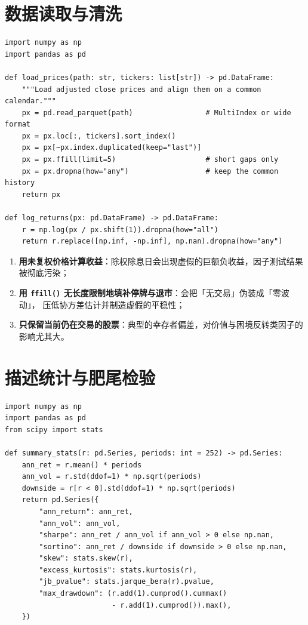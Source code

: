 \section{数据读取与清洗}

\begin{lstlisting}[style=pythonstyle,
  caption={价格数据对齐、复权与缺失值处理},
  label={lst:data}]
import numpy as np
import pandas as pd

def load_prices(path: str, tickers: list[str]) -> pd.DataFrame:
    """Load adjusted close prices and align them on a common calendar."""
    px = pd.read_parquet(path)                 # MultiIndex or wide format
    px = px.loc[:, tickers].sort_index()
    px = px[~px.index.duplicated(keep="last")]
    px = px.ffill(limit=5)                     # short gaps only
    px = px.dropna(how="any")                  # keep the common history
    return px

def log_returns(px: pd.DataFrame) -> pd.DataFrame:
    r = np.log(px / px.shift(1)).dropna(how="all")
    return r.replace([np.inf, -np.inf], np.nan).dropna(how="any")
\end{lstlisting}

\begin{warningbox}[三个最常见的清洗错误]
\begin{enumerate}[leftmargin=1.6em]
  \item \textbf{用未复权价格计算收益}：除权除息日会出现虚假的巨额负收益，因子测试结果被彻底污染；
  \item \textbf{用 \texttt{ffill()} 无长度限制地填补停牌与退市}：会把「无交易」伪装成「零波动」，
        压低协方差估计并制造虚假的平稳性；
  \item \textbf{只保留当前仍在交易的股票}：典型的幸存者偏差，对价值与困境反转类因子的影响尤其大。
\end{enumerate}
\end{warningbox}

\section{描述统计与肥尾检验}

\begin{lstlisting}[style=pythonstyle,
  caption={收益率描述统计：年化、偏度、峰度、Jarque--Bera},
  label={lst:desc}]
import numpy as np
import pandas as pd
from scipy import stats

def summary_stats(r: pd.Series, periods: int = 252) -> pd.Series:
    ann_ret = r.mean() * periods
    ann_vol = r.std(ddof=1) * np.sqrt(periods)
    downside = r[r < 0].std(ddof=1) * np.sqrt(periods)
    return pd.Series({
        "ann_return": ann_ret,
        "ann_vol": ann_vol,
        "sharpe": ann_ret / ann_vol if ann_vol > 0 else np.nan,
        "sortino": ann_ret / downside if downside > 0 else np.nan,
        "skew": stats.skew(r),
        "excess_kurtosis": stats.kurtosis(r),
        "jb_pvalue": stats.jarque_bera(r).pvalue,
        "max_drawdown": (r.add(1).cumprod().cummax()
                         - r.add(1).cumprod()).max(),
    })
\end{lstlisting}

